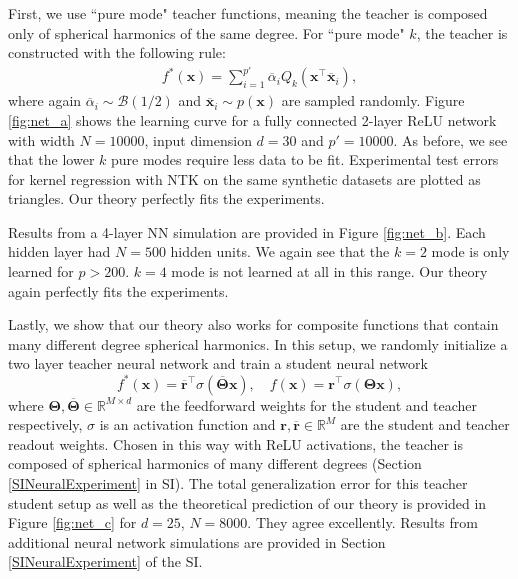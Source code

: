 \documentclass{article}
\begin{document}
First, we use ``pure mode" teacher functions, meaning the teacher is composed only of spherical harmonics of the same degree.  For ``pure mode" $k$, the teacher is constructed with the following rule:
\begin{align}\label{pure_mode}
    f^*(\mathbf{x}) = \sum_{i=1}^{p'} \overline{\alpha}_i Q_k(\mathbf{x}^\top \mathbf{\overline{x}}_i),
\end{align}
%
where again $\overline{\alpha}_i \sim \mathcal{B}(1/2)$ and $\mathbf{\overline{x}}_i \sim p(\mathbf{x})$ are sampled randomly. Figure \ref{fig:net_a} shows the learning curve for a fully connected 2-layer ReLU network with width $N=10000$, input dimension $d=30$ and $p' = 10000$. As before, we see that the lower $k$ pure modes require less data to be fit.  Experimental test errors for kernel regression with NTK on the same synthetic datasets are plotted as triangles. Our theory perfectly fits the experiments.

Results from a 4-layer NN simulation are provided in Figure \ref{fig:net_b}. Each hidden layer had $N=500$ hidden units. We again see that the $k=2$ mode is only learned for $p > 200$. $k=4$ mode is not learned at all in this range. Our theory again perfectly fits the experiments.



Lastly, we show that our theory also works for composite functions that contain many different degree spherical harmonics. In this setup, we randomly initialize a two layer teacher neural network and train a student neural network
\begin{equation}\label{student_teacher}
    f^*(\mathbf{x}) = \mathbf{\overline{r}}^\top \sigma(\mathbf{\overline{\Theta}} \mathbf{x}),  \quad f(\mathbf{x}) = \mathbf{{r}}^\top \sigma(\mathbf{{\Theta}} \mathbf{x}),
\end{equation}
%
where $\mathbf{\Theta},\mathbf{\overline{\Theta}} \in \mathbb{R}^{M \times d}$ are the feedforward weights for the student and teacher respectively, $\sigma$ is an activation function and $\mathbf{r},\mathbf{\overline{r}} \in \mathbb{R}^M$ are the student and teacher readout weights. Chosen in this way with ReLU activations, the teacher is composed of spherical harmonics of many different degrees (Section \ref{SINeuralExperiment} in SI). The total generalization error for this teacher student setup as well as the theoretical prediction of our theory is provided in Figure \ref{fig:net_c} for $d=25$, $N=8000$. They agree excellently. Results from additional neural network simulations are provided in Section \ref{SINeuralExperiment} of the SI.
\end{document}

